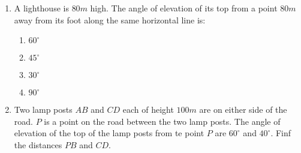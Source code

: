  \begin{enumerate}
	 \item A lighthouse is $80 m$ high. The angle of elevation of its top from a point $80 m$ away from its foot along the same horizontal line is:
		 \begin{enumerate}
			 \item $60^{\circ}$
			 \item $45^{\circ}$
			 \item $30^{\circ}$
			 \item $90^{\circ}$
		 \end{enumerate}
	 \item Two lamp posts $AB$ and $CD$ each of height $100 m$ are on either side of the road. $P$ is a point on the road between the two lamp posts. The angle of elevation of the top of the lamp posts from te point $P$ are $60^{\circ}$ and $40^{\circ}$. Finf the distances $PB$ and $CD$.
 \end{enumerate}  
